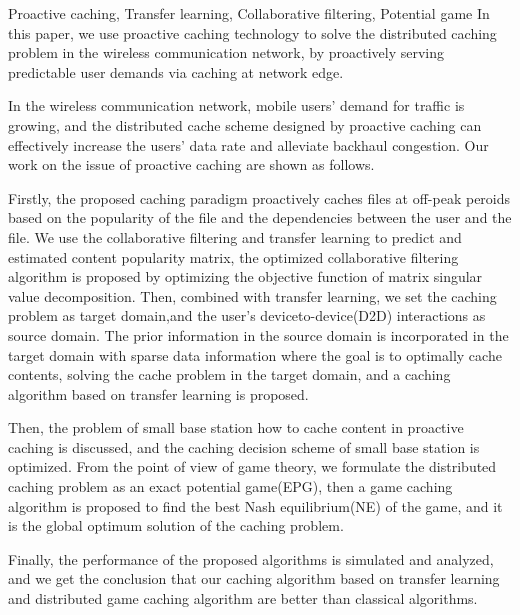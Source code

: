 \documentclass[bachelor]{seuthesis} %
\begin{document}
\begin{englishabstract}{Proactive caching, Transfer learning, Collaborative filtering, Potential game}
In this paper, we use proactive caching technology to solve the distributed caching problem in the wireless communication network, by proactively serving predictable user demands via caching at network edge. \par
In the wireless communication network, mobile users' demand for traffic is growing, and the distributed cache scheme designed by proactive caching can effectively increase the users' data rate and alleviate backhaul congestion. Our work on the issue of proactive caching are shown as follows.\par
Firstly, the proposed caching paradigm proactively caches files at off-peak peroids based on the popularity of the file and the dependencies between the user and the file. We use the collaborative filtering and transfer learning to predict and estimated content popularity matrix, the optimized collaborative filtering algorithm is proposed by optimizing the objective function of matrix singular value decomposition. Then, combined with transfer learning, we set the caching problem as target domain,and the user's deviceto-device(D2D) interactions as source domain. The prior information in the source domain is incorporated in the target domain with sparse data information where the goal is to optimally cache contents, solving the cache problem in the target domain, and a caching algorithm based on transfer learning is proposed. \par
Then, the problem of small base station how to cache content in proactive caching is discussed, and the caching decision scheme of small base station is optimized. From the point of view of game theory, we formulate the distributed caching problem as an exact potential game(EPG), then a game caching algorithm is proposed to find the best Nash equilibrium(NE) of the game, and it is the global optimum solution of the caching problem. \par
Finally, the performance of the proposed algorithms is simulated and analyzed, and we get the conclusion that our caching algorithm based on transfer learning and distributed game caching algorithm are better than classical algorithms.
\end{englishabstract}

\tableofcontents

\end{document}
